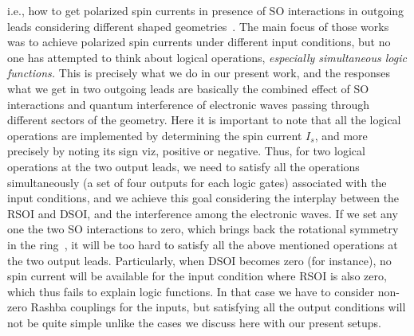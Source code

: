 \documentclass[doublecol]{epl2}
\begin{document}
i.e., how to get polarized spin currents in presence of SO interactions in 
outgoing leads considering different shaped 
geometries~\cite{spl1,spl2,spl3,spl4,spl5}. The main focus of those works 
was to achieve polarized spin currents under different input conditions, 
but no one has attempted to think about logical operations, {\em especially 
simultaneous logic functions.} This is precisely what we do in our present 
work, and the responses what we get in two outgoing leads are basically the 
combined effect of SO interactions and quantum interference of electronic 
waves passing through different sectors of the geometry. 
Here it is important to note that all the logical operations are 
implemented by determining the spin current $I_s$, and more precisely by 
noting its sign viz, positive or negative. Thus, for two logical operations at
the two output leads, we need to satisfy all the operations simultaneously
(a set of four outputs for each logic gates) associated with the input 
conditions, and we achieve this goal considering the interplay between the 
RSOI and DSOI, and the interference among the electronic waves. If we set 
any one the two SO interactions to zero, which brings back the rotational 
symmetry in the ring~\cite{spl1,spl2,spl3,spl4}, it will be too hard 
to satisfy all the above mentioned operations at the two output leads. 
Particularly, when DSOI becomes zero (for instance), no spin current will be
available for the input condition where RSOI is also zero, which thus
fails to explain logic functions. In that case we have to consider non-zero 
Rashba couplings for the inputs, but satisfying all the output conditions 
will not be quite simple unlike the cases we discuss here with our present 
setups. 
\end{document}
